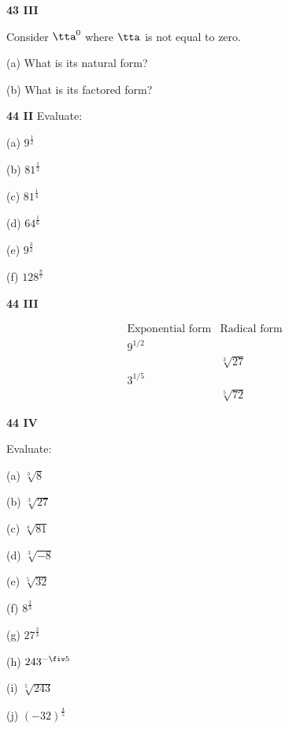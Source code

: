 \documentclass[12pt]{letter}
\renewcommand{\question}[1]{\textbf{#1}\quad}
\begin{document}
\question{43 III}

Consider $\tta^0$ where $\tta$ is not equal to zero.

(a) What is its natural form?

(b) What is its factored form?


\question{44 II} Evaluate:

(a) $9^{\frac12}$

(b) $81^{\frac12}$

(c) $81^{\frac14}$

(d) $64^{\frac16}$

(e) $9^{\frac32}$

(f) $128^{\frac87}$


\question{44 III}

\[\begin{array}{c|c}
\text{Exponential form} & \text{Radical form}\\\hline
9^{1/2}\\
&\sqrt[3]{27}\\
3^{1/5}\\
&\sqrt[5]{72}
\end{array}\]


\question{44 IV}

Evaluate:

(a) $\sqrt[3]{8}$

(b) $\sqrt[3]{27}$

(c) $\sqrt[4]{81}$

(d) $\sqrt[3]{-8}$

(e) $\sqrt[5]{32}$

(f) $8^{\frac 23}$

(g) $27^{\frac 23}$

(h) $243^{-\fiv5}$

(i) $\sqrt[5]{243}$

(j) $(-32)^{\frac45}$
\end{document}
